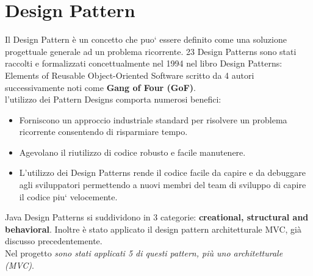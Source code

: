 \documentclass[a4paper, oneside]{book}
\begin{document}
 
 
\newpage

 
 
 \section*{Design Pattern}
Il Design Pattern è un concetto che puo` essere definito come una soluzione progettuale generale ad un problema ricorrente. 23 Design Patterns sono stati raccolti e formalizzati concettualmente nel 1994 nel libro Design Patterns: Elements of Reusable Object-Oriented Software scritto da 4 autori successivamente noti come \textbf{Gang of Four (GoF)}.\\ 
l'utilizzo dei Pattern Designs comporta numerosi benefici:
\begin{itemize}
\item Forniscono un approccio industriale standard per risolvere un problema ricorrente consentendo di risparmiare tempo.
\item  Agevolano il riutilizzo di codice robusto e facile manutenere.
\item  L'utilizzo dei Design Patterns rende il codice facile da capire e da debuggare agli sviluppatori permettendo a nuovi membri del team di sviluppo di capire il codice piu` velocemente.
\end{itemize}
Java Design Patterns si suddividono in 3 categorie: \textbf{creational, structural and behavioral}. Inoltre è stato applicato il design pattern architetturale MVC, già discusso precedentemente.
\\
Nel progetto \textit{sono stati applicati 5 di questi pattern, più uno architetturale (MVC)}.
\end{document}
